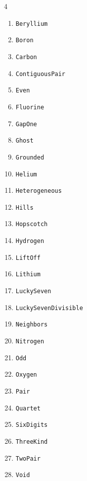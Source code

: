 \begin{multicols}4
    \begin{enumerate}
        \item \texttt{Beryllium}
        \item \texttt{Boron}
        \item \texttt{Carbon}
        \item \texttt{ContiguousPair}
        \item \texttt{Even}
        \item \texttt{Fluorine}
        \item \texttt{GapOne}
        \item \texttt{Ghost}
        \item \texttt{Grounded}
        \item \texttt{Helium}
        \item \texttt{Heterogeneous}
        \item \texttt{Hills}
        \item \texttt{Hopscotch}
        \item \texttt{Hydrogen}
        \item \texttt{LiftOff}
        \item \texttt{Lithium}
        \item \texttt{LuckySeven}
        \item {\footnotesize\texttt{LuckySevenDivisible}}\vphantom{a}
        \item \texttt{Neighbors}
        \item \texttt{Nitrogen}
        \item \texttt{Odd}
        \item \texttt{Oxygen}
        \item \texttt{Pair}
        \item \texttt{Quartet}
        \item \texttt{SixDigits}
        \item \texttt{ThreeKind}
        \item \texttt{TwoPair}
        \item \texttt{Void}
    \end{enumerate}
\end{multicols}

